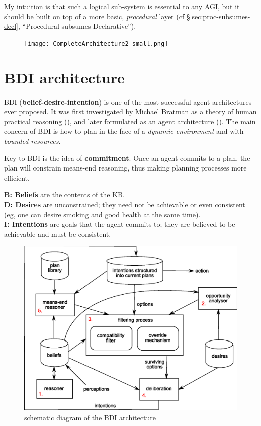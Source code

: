 \documentclass[a4paper]{report}
\begin{document}
My intuition is that such a logical sub-system is essential to any AGI, but it should be built on top of a more basic, \textit{procedural} layer (cf \S\ref{sec:proc-subsumes-decl}, ``Procedural subsumes Declarative'').

\begin{figure}[H]
\centering
\texttt{[image: CompleteArchitecture2-small.png]}
\end{figure}

\section{BDI architecture}

BDI (\textbf{belief-desire-intention}) is one of the most successful agent architectures ever proposed.  It was first investigated by Michael Bratman as a theory of human practical reasoning (\citep*{Bratman1987}), and later formulated as an agent architecture (\citep*{Bratman1988}).  The main concern of BDI is how to plan in the face of a \textit{dynamic environment} and with \textit{bounded resources}.

Key to BDI is the idea of \textbf{commitment}.  Once an agent commits to a plan, the plan will constrain means-end reasoning, thus making planning processes more efficient.

\textbf{B: Beliefs} are the contents of the KB.\\
\textbf{D: Desires} are unconstrained;  they need not be achievable or even consistent (eg, one can desire smoking and good health at the same time).\\
\textbf{I: Intentions} are goals that the agent commits to;  they are believed to be achievable and must be consistent.

\begin{figure}[t]
\centering
\includegraphics[scale=0.6]{BDI-architecture.eps}
\caption{schematic diagram of the BDI architecture}
\label{fig:BDI-arch}
\end{figure}
\end{document}
